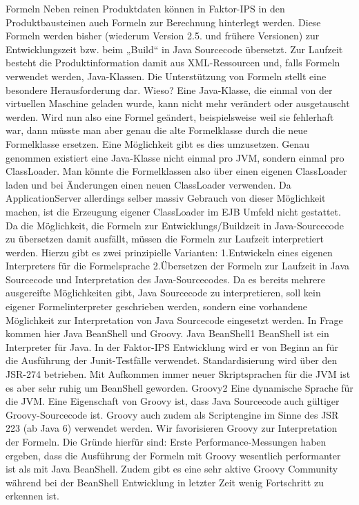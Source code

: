 Formeln
Neben reinen Produktdaten können in Faktor-IPS in den Produktbausteinen auch Formeln zur Berechnung hinterlegt werden. Diese Formeln werden bisher (wiederum Version 2.5. und frühere Versionen) zur Entwicklungszeit bzw. beim „Build“ in Java Sourcecode übersetzt. Zur Laufzeit besteht die Produktinformation damit aus XML-Ressourcen und, falls Formeln verwendet werden, Java-Klassen.
Die Unterstützung von Formeln stellt eine besondere Herausforderung dar. Wieso? Eine Java-Klasse, die einmal von der virtuellen Maschine geladen wurde, kann nicht mehr verändert oder ausgetauscht werden. Wird nun also eine Formel geändert, beispielsweise weil sie fehlerhaft war, dann müsste man aber genau die alte Formelklasse durch die neue Formelklasse ersetzen. 
Eine Möglichkeit gibt es dies umzusetzen. Genau genommen existiert eine Java-Klasse nicht einmal pro JVM, sondern einmal pro ClassLoader. Man könnte die Formelklassen also über einen eigenen ClassLoader laden und bei Änderungen einen neuen ClassLoader verwenden. Da ApplicationServer allerdings selber massiv Gebrauch von dieser Möglichkeit machen, ist die Erzeugung eigener ClassLoader im EJB Umfeld nicht gestattet.
Da die Möglichkeit, die Formeln zur Entwicklungs/Buildzeit in Java-Sourcecode zu übersetzen damit ausfällt, müssen die Formeln zur Laufzeit interpretiert werden. Hierzu gibt es zwei prinzipielle Varianten:
1.Entwickeln eines eigenen Interpreters für die Formelsprache
2.Übersetzen der Formeln zur Laufzeit in Java Sourcecode und Interpretation des Java-Sourcecodes. 
Da es bereits mehrere ausgereifte Möglichkeiten gibt, Java Sourcecode zu interpretieren, soll kein eigener Formelinterpreter geschrieben werden, sondern eine vorhandene Möglichkeit zur Interpretation von Java Sourcecode eingesetzt werden. In Frage kommen hier Java BeanShell und Groovy.
Java BeanShell1
BeanShell ist ein Interpreter für Java. In der Faktor-IPS Entwicklung wird er von Beginn an für die Ausführung der Junit-Testfälle verwendet. Standardisierung wird über den JSR-274 betrieben. Mit Aufkommen immer neuer Skriptsprachen für die JVM ist es aber sehr ruhig um BeanShell geworden.
Groovy2
Eine dynamische Sprache für die JVM. Eine Eigenschaft von Groovy ist, dass Java Sourcecode auch gültiger Groovy-Sourcecode ist. Groovy auch zudem als Scriptengine im Sinne des JSR 223 (ab Java 6) verwendet werden.
Wir favorisieren Groovy zur Interpretation der Formeln. Die Gründe hierfür sind:
Erste Performance-Messungen haben ergeben, dass die Ausführung der Formeln mit Groovy wesentlich performanter ist als mit Java BeanShell.
Zudem gibt es eine sehr aktive Groovy Community während bei der BeanShell Entwicklung in letzter Zeit wenig Fortschritt zu erkennen ist.
